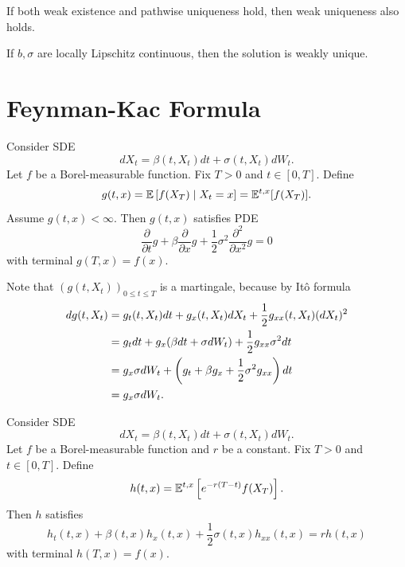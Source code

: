 \begin{thm}
    If both weak existence and pathwise uniqueness hold, then weak uniqueness also holds.
\end{thm}
\begin{cor}
    If $b,\sigma$ are locally Lipschitz continuous, then the solution is weakly unique.
\end{cor}



\section{Feynman-Kac Formula}

\begin{thm}
    Consider SDE
    \begin{equation*}
        dX_t = \beta(t,X_t)dt+ \sigma(t,X_t)dW_t.
    \end{equation*}
    Let $f$ be a Borel-measurable function. Fix $T > 0$ and $t \in [0,T]$. Define
    \begin{equation*}
        g(t,x) = \mathbb{E}\left[f(X_T) \mid X_t = x\right] = \mathbb{E}^{t,x}[f(X_T)].
    \end{equation*}
    Assume $g(t,x) < \infty$. Then $g(t,x)$ satisfies PDE
    \begin{equation*}
        \frac{\partial}{\partial t}g + \beta \frac{\partial}{\partial x} g + \frac{1}{2} \sigma^2 \frac{\partial^2}{\partial x^2}g = 0
    \end{equation*}
    with terminal $g(T,x) = f(x)$.
\end{thm}
\begin{rmk}
    Note that $(g(t,X_t))_{0 \leq t \leq T}$ is a martingale, because by It\^o formula
    \begin{align*}
        dg(t,X_t) &= g_t(t,X_t)dt + g_x(t,X_t)dX_t + \frac{1}{2}g_{xx}(t,X_t)(dX_t)^2 \\
        &= g_tdt+g_x(\beta dt + \sigma dW_t) + \frac{1}{2}g_{xx} \sigma^2 dt \\
        &= g_x \sigma dW_t + \left(g_t + \beta g_x + \frac{1}{2}\sigma^2 g_{xx}\right)dt \\
        &= g_x \sigma dW_t.
    \end{align*}
\end{rmk}

\begin{thm}
    Consider SDE
    \begin{equation*}
        dX_t = \beta(t,X_t)dt+ \sigma(t,X_t)dW_t.
    \end{equation*}
    Let $f$ be a Borel-measurable function and $r$ be a constant. Fix $T > 0$ and $t \in [0,T]$. 
    Define
    \begin{equation*}
        h(t,x) = \mathbb{E}^{t,x}\left[e^{-r(T-t)}f(X_T)\right].
    \end{equation*}
    Then $h$ satisfies
    \begin{equation*}
        h_t(t,x) + \beta(t,x)h_x(t,x)+ \frac{1}{2}\sigma(t,x)h_{xx}(t,x) = r h(t,x)
    \end{equation*}
    with terminal $h(T,x) = f(x)$.
\end{thm}

